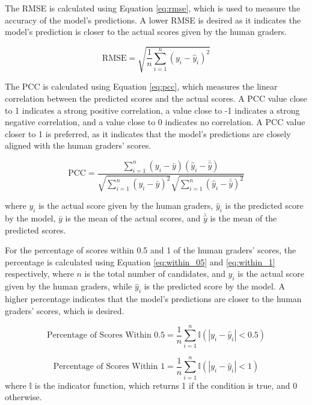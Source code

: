 The RMSE is calculated using Equation \ref{eq:rmse}, which is used to measure the accuracy of the model's predictions. A lower RMSE is desired as it indicates the model's prediction is closer to the actual scores given by the human graders.

\begin{equation} \label{eq:rmse}
    \text{RMSE} = \sqrt{\frac{1}{n} \sum_{i=1}^{n} (y_i - \hat{y}_i)^2}
\end{equation}

The PCC is calculated using Equation \ref{eq:pcc}, which measures the linear correlation between the predicted scores and the actual scores. A PCC value close to 1 indicates a strong positive correlation, a value close to -1 indicates a strong negative correlation, and a value close to 0 indicates no correlation. A PCC value closer to 1 is preferred, as it indicates that the model's predictions are closely aligned with the human graders' scores.

\begin{equation} \label{eq:pcc}
    \text{PCC} = \frac{\sum_{i=1}^{n} (y_i - \bar{y})(\hat{y}_i - \bar{\hat{y}})}{\sqrt{\sum_{i=1}^{n} (y_i - \bar{y})^2} \sqrt{\sum_{i=1}^{n} (\hat{y}_i - \bar{\hat{y}})^2}}
\end{equation}

where $y_i$ is the actual score given by the human graders, $\hat{y}_i$ is the predicted score by the model, $\bar{y}$ is the mean of the actual scores, and $\bar{\hat{y}}$ is the mean of the predicted scores.

For the percentage of scores within 0.5 and 1 of the human graders' scores, the percentage is calculated using Equation \ref{eq:within_05} and \ref{eq:within_1} respectively, where $n$ is the total number of candidates, and $y_i$ is the actual score given by the human graders, while $\hat{y}_i$ is the predicted score by the model. A higher percentage indicates that the model's predictions are closer to the human graders' scores, which is desired.

\begin{equation} \label{eq:within_05}
    \text{Percentage of Scores Within 0.5} = \frac{1}{n} \sum_{i=1}^{n} \mathbb{I}(|y_i - \hat{y}_i| < 0.5)
\end{equation}

\begin{equation} \label{eq:within_1}
    \text{Percentage of Scores Within 1} = \frac{1}{n} \sum_{i=1}^{n} \mathbb{I}(|y_i - \hat{y}_i| < 1)
\end{equation}
where $\mathbb{I}$ is the indicator function, which returns 1 if the condition is true, and 0 otherwise.

